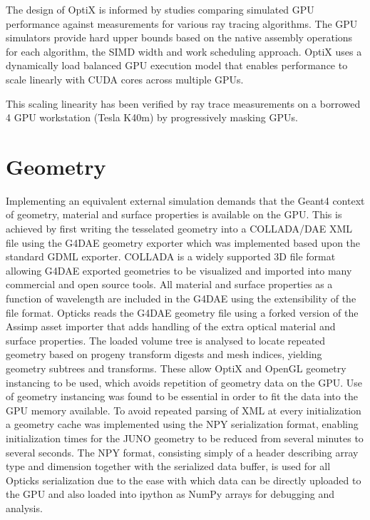\documentclass[a4paper]{jpconf}
\begin{document}
The design of OptiX is informed by studies\cite{understanding}\cite{understandingAddendum}
comparing simulated GPU performance against measurements
for various ray tracing algorithms. The GPU simulators 
provide hard upper bounds based on the native assembly operations
for each algorithm, the SIMD width and work scheduling approach. 
OptiX uses a dynamically load balanced GPU execution model that enables
performance to scale linearly with CUDA cores across multiple GPUs. 

This scaling linearity has been verified by ray trace measurements on a 
borrowed 4 GPU workstation (Tesla K40m) by progressively masking GPUs.


\section{Geometry}

Implementing an equivalent external simulation demands that the Geant4 
context of geometry, material and surface properties is available on the GPU.
This is achieved by first writing the tesselated geometry into a COLLADA/DAE\cite{colladaURL} XML file  
using the G4DAE\cite{g4daeURL} geometry exporter which was implemented based upon the 
standard GDML exporter. COLLADA is a widely supported 3D file format allowing G4DAE exported geometries 
to be visualized and imported into many commercial and open source tools.
All material and surface properties as a function of wavelength are 
included in the G4DAE using the extensibility of the file format.
Opticks reads the G4DAE geometry file using a forked version\cite{AssimpFork} of the
Assimp\cite{Assimp} asset importer that adds handling of the extra optical material and surface
properties. 
The loaded volume tree is analysed to locate repeated geometry based 
on progeny transform digests and mesh indices, yielding geometry subtrees and transforms.
These allow OptiX and OpenGL geometry instancing to be used, which avoids repetition of geometry 
data on the GPU. Use of geometry instancing was found to be essential in order to fit the 
data into the GPU memory available. 
To avoid repeated parsing of XML at every initialization
a geometry cache was implemented using the NPY\cite{NPY} serialization format, enabling 
initialization times for the JUNO geometry to be reduced from several minutes to several seconds.
The NPY format, consisting simply of a header describing array type and dimension together 
with the serialized data buffer, is used for all Opticks serialization due
to the ease with which data can be directly uploaded to the GPU and also 
loaded into ipython\cite{ipython} as NumPy\cite{numpy} arrays for debugging and analysis.
\end{document}
